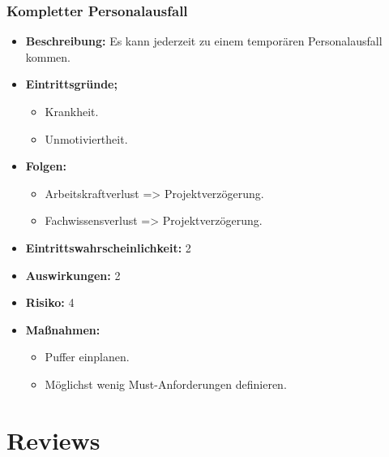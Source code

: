 \subsubsection{Kompletter Personalausfall}
\begin{itemize}
	\item \textbf{Beschreibung:} \newline
	Es kann jederzeit zu einem temporären Personalausfall kommen.
	\item \textbf{Eintrittsgründe;}
	\begin{itemize}
		\item Krankheit.
		\item Unmotiviertheit.
	\end{itemize}
	\item \textbf{Folgen:}
	\begin{itemize}
		\item Arbeitskraftverlust => Projektverzögerung.
		\item Fachwissensverlust => Projektverzögerung.
	\end{itemize}
	\item \textbf{Eintrittswahrscheinlichkeit:} 2
	\item \textbf{Auswirkungen:} 2
	\item \textbf{Risiko:} 4
	\item \textbf{Maßnahmen:}
	\begin{itemize}
		\item Puffer einplanen.
		\item Möglichst wenig Must-Anforderungen definieren.
	\end{itemize}
\end{itemize}

\section{Reviews}
